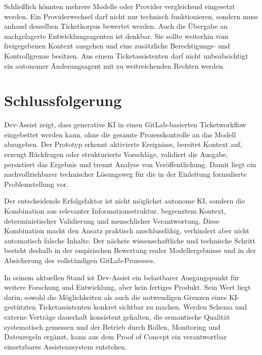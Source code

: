 Schließlich könnten mehrere Modelle oder Provider vergleichend eingesetzt werden. Ein Providerwechsel darf nicht nur technisch funktionieren, sondern muss anhand desselben Ticketkorpus bewertet werden. Auch die Übergabe an nachgelagerte Entwicklungsagenten ist denkbar. Sie sollte weiterhin vom freigegebenen Kontext ausgehen und eine zusätzliche Berechtigungs- und Kontrollgrenze besitzen. Aus einem Ticketassistenten darf nicht unbeabsichtigt ein autonomer Änderungsagent mit zu weitreichenden Rechten werden.

\section{Schlussfolgerung}

Dev-Assist zeigt, dass generative KI in einen GitLab-basierten Ticketworkflow eingebettet werden kann, ohne die gesamte Prozesskontrolle an das Modell abzugeben. Der Prototyp erkennt aktivierte Ereignisse, bereitet Kontext auf, erzeugt Rückfragen oder strukturierte Vorschläge, validiert die Ausgabe, persistiert das Ergebnis und trennt Analyse von Veröffentlichung. Damit liegt ein nachvollziehbarer technischer Lösungsweg für die in der Einleitung formulierte Problemstellung vor.

Der entscheidende Erfolgsfaktor ist nicht möglichst autonome KI, sondern die Kombination aus relevanter Informationsstruktur, begrenztem Kontext, deterministischer Validierung und menschlicher Verantwortung. Diese Kombination macht den Ansatz praktisch anschlussfähig, verhindert aber nicht automatisch falsche Inhalte. Der nächste wissenschaftliche und technische Schritt besteht deshalb in der empirischen Bewertung realer Modellergebnisse und in der Absicherung des vollständigen GitLab-Prozesses.

In seinem aktuellen Stand ist Dev-Assist ein belastbarer Ausgangspunkt für weitere Forschung und Entwicklung, aber kein fertiges Produkt. Sein Wert liegt darin, sowohl die Möglichkeiten als auch die notwendigen Grenzen eines KI-gestützten Ticketassistenten konkret sichtbar zu machen. Werden Schema und externe Verträge dauerhaft konsistent gehalten, die semantische Qualität systematisch gemessen und der Betrieb durch Rollen, Monitoring und Datenregeln ergänzt, kann aus dem Proof of Concept ein verantwortbar einsetzbares Assistenzsystem entstehen.

\endinput
\clearpage
\section*{Quellen zu Kapitel 9}
\enlargethispage{3\baselineskip}

